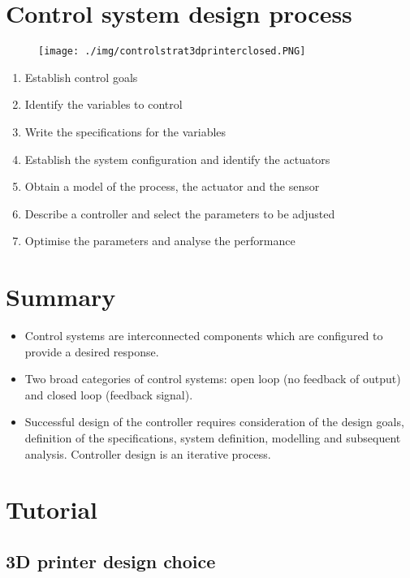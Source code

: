 \section{Control system design process}
\begin{figure}
  \centering
  \texttt{[image: ./img/controlstrat3dprinterclosed.PNG]}
\end{figure}
\begin{enumerate}
  \item Establish control goals
  \item Identify the variables to control
  \item Write the specifications for the variables
  \item Establish the system configuration and identify the actuators
  \item Obtain a model of the process, the actuator and the sensor
  \item Describe a controller and select the parameters to be adjusted
  \item Optimise the parameters and analyse the performance
\end{enumerate}
\section{Summary}
\begin{itemize}
  \item Control systems are interconnected components which are configured to provide a desired response.
  \item Two broad categories of control systems: open loop (no feedback of output) and closed loop (feedback signal).
  \item Successful design of the controller requires consideration of the design goals, definition of the specifications, system definition, modelling and subsequent analysis. Controller design is an iterative process.
\end{itemize}
\section{Tutorial}
\subsection*{3D printer design choice}
